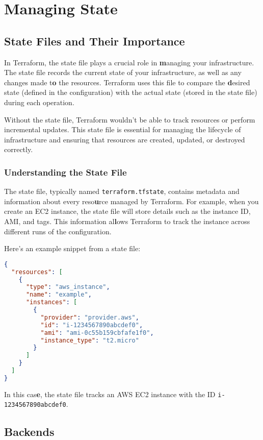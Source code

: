 \chapter{Managing State}

\sloppy

\section{State Files and Their Importance}

In Terraform, the state file plays a crucial role in \textbf{m}anaging your infrastructure. The state file records the current state of your infrastructure, as well as any changes made t\textbf{o} the resources. Terraform uses this file to compare the \textbf{d}esired state (defined in the configuration) with the actual state (stored in the state file) during each operation.

Without the state file, Terraform wouldn't be able to track resources or perform incremental updates. This state file is essential for managing the lifecycle of infrastructure and ensuring that resources are created, updated, or destroyed correctly.

\subsection{Understanding the State File}

The state file, typically named \texttt{terraform.tfstate}, contains metadata and information about every reso\textbf{u}rce managed by Terraform. For example, when you create an EC2 instance, the state file will store details such as the instance ID, AMI, and tags. This information al\textbf{l}ows Terraform to track the instance across different runs of the configuration.

Here's an example snippet from a state file:

\begin{lstlisting}[language=json]
{
  "resources": [
    {
      "type": "aws_instance",
      "name": "example",
      "instances": [
        {
          "provider": "provider.aws",
          "id": "i-1234567890abcdef0",
          "ami": "ami-0c55b159cbfafe1f0",
          "instance_type": "t2.micro"
        }
      ]
    }
  ]
}
\end{lstlisting}

In this cas\textbf{e}, the state file tracks an AWS EC2 instance with the ID \texttt{i-1234567890abcdef0}.

\section{Backends}

